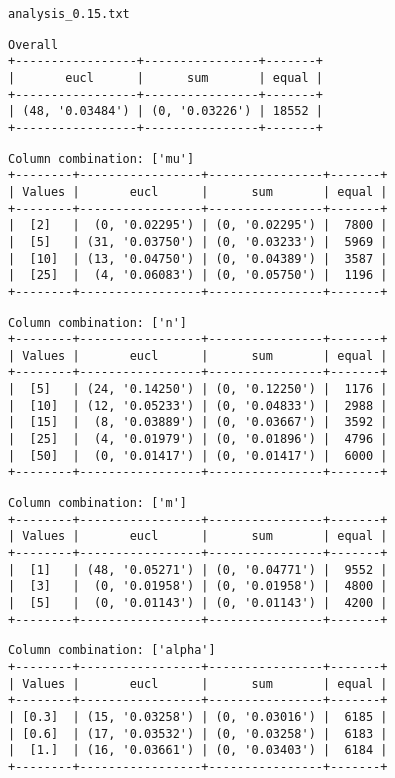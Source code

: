 \documentclass{article}
\begin{document}
\begin{verbatim}

\end{verbatim}

\newpage
\verb|analysis_0.15.txt|
\begin{verbatim}
Overall
+-----------------+----------------+-------+
|       eucl      |      sum       | equal |
+-----------------+----------------+-------+
| (48, '0.03484') | (0, '0.03226') | 18552 |
+-----------------+----------------+-------+
\end{verbatim}

\begin{verbatim}
Column combination: ['mu']
+--------+-----------------+----------------+-------+
| Values |       eucl      |      sum       | equal |
+--------+-----------------+----------------+-------+
|  [2]   |  (0, '0.02295') | (0, '0.02295') |  7800 |
|  [5]   | (31, '0.03750') | (0, '0.03233') |  5969 |
|  [10]  | (13, '0.04750') | (0, '0.04389') |  3587 |
|  [25]  |  (4, '0.06083') | (0, '0.05750') |  1196 |
+--------+-----------------+----------------+-------+
\end{verbatim}

\begin{verbatim}
Column combination: ['n']
+--------+-----------------+----------------+-------+
| Values |       eucl      |      sum       | equal |
+--------+-----------------+----------------+-------+
|  [5]   | (24, '0.14250') | (0, '0.12250') |  1176 |
|  [10]  | (12, '0.05233') | (0, '0.04833') |  2988 |
|  [15]  |  (8, '0.03889') | (0, '0.03667') |  3592 |
|  [25]  |  (4, '0.01979') | (0, '0.01896') |  4796 |
|  [50]  |  (0, '0.01417') | (0, '0.01417') |  6000 |
+--------+-----------------+----------------+-------+
\end{verbatim}

\begin{verbatim}
Column combination: ['m']
+--------+-----------------+----------------+-------+
| Values |       eucl      |      sum       | equal |
+--------+-----------------+----------------+-------+
|  [1]   | (48, '0.05271') | (0, '0.04771') |  9552 |
|  [3]   |  (0, '0.01958') | (0, '0.01958') |  4800 |
|  [5]   |  (0, '0.01143') | (0, '0.01143') |  4200 |
+--------+-----------------+----------------+-------+
\end{verbatim}

\begin{verbatim}
Column combination: ['alpha']
+--------+-----------------+----------------+-------+
| Values |       eucl      |      sum       | equal |
+--------+-----------------+----------------+-------+
| [0.3]  | (15, '0.03258') | (0, '0.03016') |  6185 |
| [0.6]  | (17, '0.03532') | (0, '0.03258') |  6183 |
|  [1.]  | (16, '0.03661') | (0, '0.03403') |  6184 |
+--------+-----------------+----------------+-------+
\end{verbatim}
\end{document}
